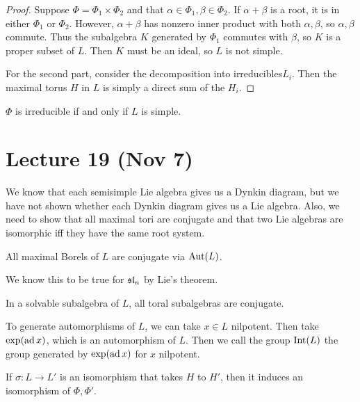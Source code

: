 \documentclass[twoside, 10pt]{article}
\begin{document}
    \begin{proof}
        Suppose $\Phi = \Phi_1 \times \Phi_2$ and that $\alpha \in \Phi_1, \beta \in \Phi_2$. If $\alpha + \beta$ is a root, it is in either $\Phi_1$ or $\Phi_2$. However, $\alpha + \beta$ has nonzero inner product with both $\alpha, \beta$, so $\alpha,\beta$ commute. Thus the subalgebra $K$ generated by $\Phi_1$ commutes with $\beta$, so $K$ is a proper subset of $L$. Then $K$ must be an ideal, so $L$ is not simple.

        For the second part, consider the decomposition into irreducibles$L_i$. Then the maximal torus $H$ in $L$ is simply a direct sum of the $H_i$. 
    \end{proof}

    \begin{cor}
        $\Phi$ is irreducible if and only if $L$ is simple.
    \end{cor}

    \section{Lecture 19 (Nov 7)}%
    \label{sec:lecture_19_nov_}
    
    We know that each semisimple Lie algebra gives us a Dynkin diagram, but we have not shown whether each Dynkin diagram gives us a Lie algebra. Also, we need to show that all maximal tori are conjugate and that two Lie algebras are isomorphic iff they have the same root system.

    \begin{lem}
        All maximal Borels of $L$ are conjugate via $\operatorname{Aut}(L)$.
    \end{lem}

    We know this to be true for $\mathfrak{sl}_n$ by Lie's theorem.

    \begin{lem}
        In a solvable subalgebra of $L$, all toral subalgebras are conjugate.
    \end{lem}

    To generate automorphisms of $L$, we can take $x \in L$ nilpotent. Then take $\exp(\operatorname{ad} x)$, which is an automorphism of $L$. Then we call the group $\mathrm{Int}(L)$ the group generated by $\exp(\operatorname{ad} x)$ for $x$ nilpotent.

    \begin{prop}
        If $\sigma:L \to L'$ is an isomorphism that takes $H$ to $H'$, then it induces an isomorphism of $\Phi, \Phi'$.
    \end{prop}
\end{document}
